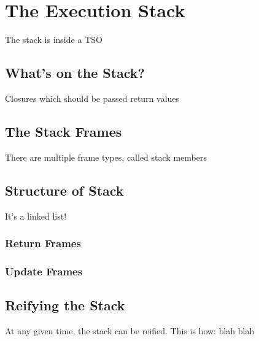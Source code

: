 \chapter{The Execution Stack}

The stack is inside a TSO

\section{What's on the Stack?}

Closures which should be passed return values

\section{The Stack Frames}

There are multiple frame types, called stack members

\section{Structure of Stack}

It's a linked list! 

\subsection{Return Frames}

\subsection{Update Frames}

\section{Reifying the Stack}

At any given time, the stack can be reified. This is how: blah blah
